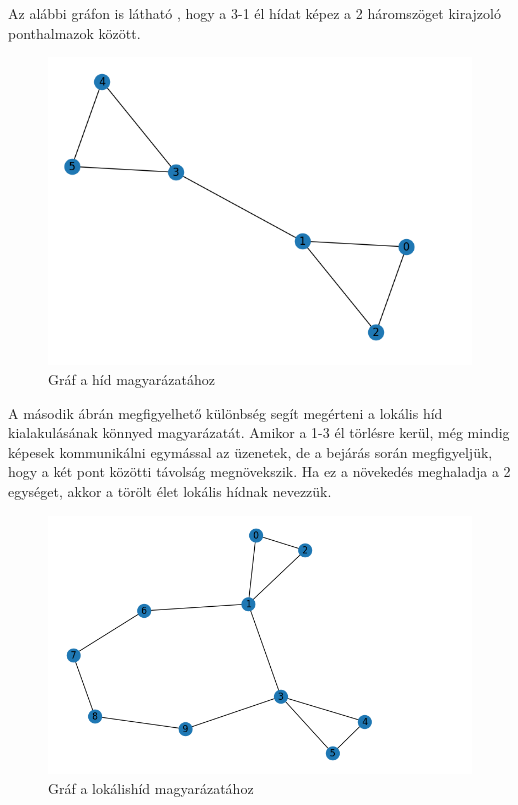 Az alábbi gráfon is látható , hogy a 3-1 él hídat képez a 2 háromszöget kirajzoló ponthalmazok között.
\begin{figure}[h]
    \centering
    \includegraphics[scale=0.5]{images/hid}
    \caption{Gráf a híd magyarázatához}
    \label{fig:enter-label}
\end{figure}

A második ábrán megfigyelhető különbség segít megérteni a lokális híd kialakulásának könnyed magyarázatát. Amikor a 1-3 él törlésre kerül, még mindig képesek kommunikálni egymással az üzenetek, de a bejárás során megfigyeljük, hogy a két pont közötti távolság megnövekszik. Ha ez a növekedés meghaladja a 2 egységet, akkor a törölt élet lokális hídnak nevezzük.


\begin{figure}[h]
    \centering
    \includegraphics[scale=0.5]{images/lokalishid}
    \caption{Gráf a lokálishíd magyarázatához}
    \label{fig:enter-label}
\end{figure}
 
